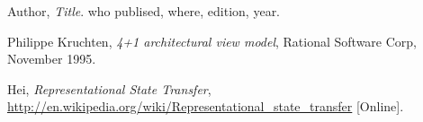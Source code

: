 \documentclass[../document]{subfiles}
\begin{document}
\begin{thebibliography}{1}
\label{Bibliography}


  Author,
  {\em Title}.
  who publised, where,
  edition,
  year.

 Philippe Kruchten, {\em 4+1 architectural view model}, Rational Software Corp, November 1995.

Hei, {\em Representational State Transfer}, \url{http://en.wikipedia.org/wiki/Representational_state_transfer} [Online].





\end{thebibliography}
\end{document}
